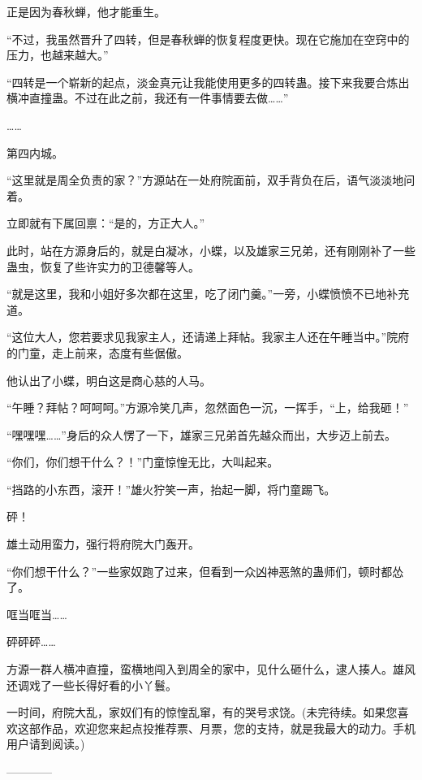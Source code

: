 \begin{this_body}
正是因为春秋蝉，他才能重生。

“不过，我虽然晋升了四转，但是春秋蝉的恢复程度更快。现在它施加在空窍中的压力，也越来越大。”

“四转是一个崭新的起点，淡金真元让我能使用更多的四转蛊。接下来我要合炼出横冲直撞蛊。不过在此之前，我还有一件事情要去做……”

……

第四内城。

“这里就是周全负责的家？”方源站在一处府院面前，双手背负在后，语气淡淡地问着。

立即就有下属回禀：“是的，方正大人。”

此时，站在方源身后的，就是白凝冰，小蝶，以及雄家三兄弟，还有刚刚补了一些蛊虫，恢复了些许实力的卫德馨等人。

“就是这里，我和小姐好多次都在这里，吃了闭门羹。”一旁，小蝶愤愤不已地补充道。

“这位大人，您若要求见我家主人，还请递上拜帖。我家主人还在午睡当中。”院府的门童，走上前来，态度有些倨傲。

他认出了小蝶，明白这是商心慈的人马。

“午睡？拜帖？呵呵呵。”方源冷笑几声，忽然面色一沉，一挥手，“上，给我砸！”

“嘿嘿嘿……”身后的众人愣了一下，雄家三兄弟首先越众而出，大步迈上前去。

“你们，你们想干什么？！”门童惊惶无比，大叫起来。

“挡路的小东西，滚开！”雄火狞笑一声，抬起一脚，将门童踢飞。

砰！

雄土动用蛮力，强行将府院大门轰开。

“你们想干什么？”一些家奴跑了过来，但看到一众凶神恶煞的蛊师们，顿时都怂了。

哐当哐当……

砰砰砰……

方源一群人横冲直撞，蛮横地闯入到周全的家中，见什么砸什么，逮人揍人。雄风还调戏了一些长得好看的小丫鬟。

一时间，府院大乱，家奴们有的惊惶乱窜，有的哭号求饶。(未完待续。如果您喜欢这部作品，欢迎您来起点投推荐票、月票，您的支持，就是我最大的动力。手机用户请到阅读。)

------------

\end{this_body}

